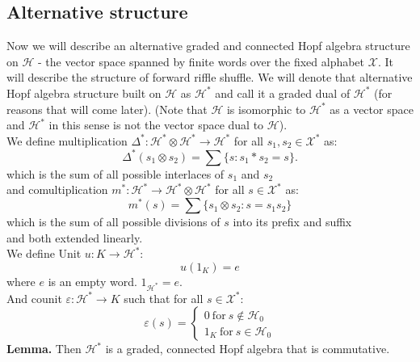 \documentclass[a4paper, 12pt]{article}
\begin{document}
\subsection{Alternative structure    }
\indent Now we will describe an alternative graded and connected Hopf algebra structure on $\mathcal{H}$ -
the
vector space spanned
by finite words over the fixed alphabet $\mathcal{X}$. It will describe the structure of forward riffle
shuffle.
We will denote that alternative Hopf algebra structure
built on $\mathcal{H}$ as $\mathcal{H}^*$ and call it a graded dual of $\mathcal{H}^*$ (for reasons that
will come later).
(Note that $\mathcal{H}$ is isomorphic to $\mathcal{H}^*$ as a vector space and $\mathcal{H}^*$ in this
sense is not the vector space dual to $\mathcal{H}$). \\
We define multiplication $\Delta^* : \mathcal{H}^* \otimes \mathcal{H}^* \to \mathcal{H}^*$
for all $s_1, s_2 \in \mathcal{X}^*$ as:
\begin{equation*}
\Delta^*(s_1 \otimes s_2) = \sum\{s : s_1*s_2 = s\}.
\end{equation*}
which is the sum of all possible interlaces of $s_1$ and $s_2$ \\
and comultiplication $m^* : \mathcal{H}^* \to \mathcal{H}^* \otimes \mathcal{H}^*$ for all $s \in
\mathcal{X}^*$ as:
\begin{equation*}
m^*(s) = \sum\{ s_1 \otimes s_2 : s=s_1s_2 \}
\end{equation*}
which is the sum of all possible divisions of $s$ into its prefix and suffix \\
and both extended linearly. \\
We define Unit $u : K \to \mathcal{H}^*$:
\begin{equation*}
u(1_K) = e
\end{equation*}
where $e$ is an empty word. $1_{\mathcal{H}^*} = e$. \\
And counit $\varepsilon : \mathcal{H}^* \to K$ such that for all $s \in \mathcal{X}^*$: \\
\begin{equation*}
\varepsilon(s) = \begin{cases}
0 \mathrm{\ for\ } s \notin \mathcal{H}_0 \\
1_K \mathrm{\ for\ } s \in \mathcal{H}_0
\end{cases}
\end{equation*}
\textbf{Lemma. } Then $\mathcal{H}^*$ is a graded, connected Hopf algebra that is commutative.
\end{document}
